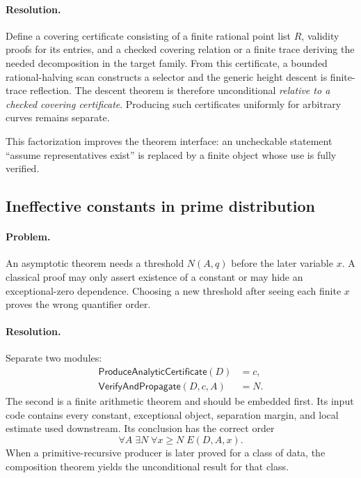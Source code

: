 \paragraph{Resolution.}
Define a covering certificate consisting of a finite rational point list
\(R\), validity proofs for its entries, and a checked covering relation or a
finite trace deriving the needed decomposition in the target family.  From
this certificate, a bounded rational-halving scan constructs a selector and
the generic height descent is finite-trace reflection.  The descent theorem is
therefore unconditional \emph{relative to a checked covering certificate}.
Producing such certificates uniformly for arbitrary curves remains separate.

This factorization improves the theorem interface: an uncheckable statement
``assume representatives exist'' is replaced by a finite object whose use is
fully verified.

\subsection{Ineffective constants in prime distribution}

\paragraph{Problem.}
An asymptotic theorem needs a threshold \(N(A,q)\) before the later variable
\(x\).  A classical proof may only assert existence of a constant or may hide
an exceptional-zero dependence.  Choosing a new threshold after seeing each
finite \(x\) proves the wrong quantifier order.

\paragraph{Resolution.}
Separate two modules:
\begin{align*}
 \mathsf{ProduceAnalyticCertificate}(D)&=c,\\
 \mathsf{VerifyAndPropagate}(D,c,A)&=N.
\end{align*}
The second is a finite arithmetic theorem and should be embedded first.  Its
input code contains every constant, exceptional object, separation margin, and
local estimate used downstream.  Its conclusion has the correct order
\[
 \forall A\;\exists N\;\forall x\ge N\;E(D,A,x).
\]
When a primitive-recursive producer is later proved for a class of data, the
composition theorem yields the unconditional result for that class.

